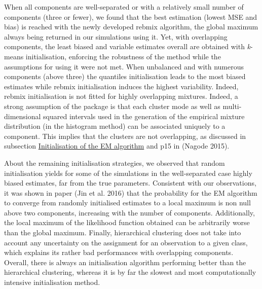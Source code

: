 When all components are well-separated or with a relatively small number of components (three or fewer), we found that the best
estimation (lowest MSE and bias) is reached with the newly developed
rebmix algorithm, the global maximum always being returned in our
simulations using it. Yet, with overlapping components, the least biased
and variable estimates overall are obtained with \emph{k}-means
initialisation, enforcing the robustness of the method while the
assumptions for using it were not met. When unbalanced and with numerous components (above three) the quantiles initialisation leads to the most biased estimates while rebmix initialisation induces the highest variability. Indeed, rebmix
initialisation is not fitted for highly overlapping mixtures. Indeed, a strong assumption of the package is that each cluster mode as well as multi-dimensional squared intervals used in the generation of the empirical mixture distribution (in the histogram method) can be associated uniquely to a component. This implies that the clusters are not overlapping, as discussed in subsection \protect\hyperlink{initialisation-of-the-em-algorithm}{Initialisation of the EM algorithm} and p15 in (Nagode 2015).

About the remaining initialisation strategies, we observed that random initialisation yields for some of the simulations in the well-separated case highly biased estimates, far from the true
parameters. Consistent with our observations, it was shown in paper
(Jin et al. 2016) that the probability for the EM algorithm to converge from
randomly initialised estimates to a local maximum is non null above two
components, increasing with the number of components. Additionally, the
local maximum of the likelihood function obtained can be arbitrarily
worse than the global maximum. Finally, hierarchical clustering does not
take into account any uncertainty on the assignment for an observation
to a given class, which explains its rather bad performances with
overlapping components. Overall, there is always an initialisation
algorithm performing better than the hierarchical clustering, whereas it
is by far the slowest and most computationally intensive initialisation
method.

